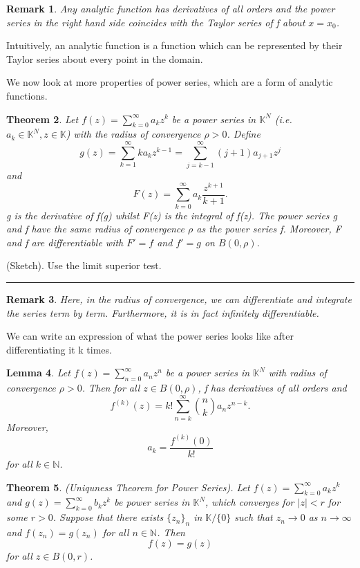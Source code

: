 \documentclass[twoside]{article}
\newcounter{lecnum}
\newtheorem{theorem}{Theorem}[lecnum]
\newtheorem{lemma}[theorem]{Lemma}
\newtheorem{remark}[theorem]{Remark}
\newenvironment{proof}{{\bf Proof:}}{\hfill\rule{2mm}{2mm}}
\begin{document}
\begin{remark} Any analytic function has derivatives of all orders and the power series in the right hand side coincides with the Taylor series of f about $x = x_0$.
\end{remark}

Intuitively, an analytic function is a function which can be represented by their Taylor series about every point in the domain.

We now look at more properties of power series, which are a form of analytic functions.

\begin{theorem}Let $f(z) = \sum_{k=0}^{\infty}a_kz^k$ be a power series in $\mathbb{K}^N$ (i.e. $a_k \in \mathbb{K}^N, z \in \mathbb{K}$) with the radius of convergence $\rho > 0$. Define $$g(z) = \sum_{k=1}^{\infty}ka_kz^{k-1} = \sum_{j=k-1}^{\infty}(j + 1)a_{j+1}z^j$$ and $$F(z) = \sum_{k=0}^{\infty}a_k\frac{z^{k+1}}{k+1}.$$ g is the derivative of f(g) whilst F(z) is the integral of f(z). The power series g and f have the same radius of convergence $\rho$ as the power series f. Moreover, F and f are differentiable with $F' = f$ and $f' = g$ on $B(0,\rho)$.
\end{theorem}

\begin{proof}(Sketch). Use the limit superior test.
\end{proof}

\begin{remark} Here, in the radius of convergence, we can differentiate and integrate the series term by term. Furthermore, it is in fact infinitely differentiable.
\end{remark}

We can write an expression of what the power series looks like after differentiating it k times.
\begin{lemma}Let $f(z) = \sum_{n=0}^{\infty}a_nz^n$ be a power series in $\mathbb{K}^N$ with radius of convergence $\rho > 0$. Then for all $z \in B(0,\rho)$, f has derivatives of all orders and $$f^{(k)}(z) = k!\sum_{n=k}^{\infty}{n \choose k}a_nz^{n-k}.$$ Moreover, $$a_k = \frac{f^{(k)}(0)}{k!}$$ for all $k \in \mathbb{N}$.
\end{lemma}

\begin{theorem}(Uniquness Theorem for Power Series). Let $f(z) = \sum_{k=0}^{\infty}a_kz^k$ and $g(z) = \sum_{k=0}^{\infty}b_kz^k$ be power series in $\mathbb{K}^N$, which converges for $|z| < r$ for some $r > 0$. Suppose that there exists $\{z_n\}_n$ in $\mathbb{K}/\{0\}$ such that $z_n \rightarrow 0$ as $n \rightarrow \infty$ and $f(z_n) = g(z_n)$ for all $n \in \mathbb{N}$. Then 
$$
f(z) = g(z)
$$
for all $z \in B(0,r)$.
\end{theorem}
\end{document}
